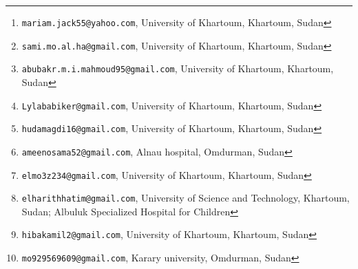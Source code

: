 \documentclass[12pt]{article}
\title{\color{titleColor}{\textbf{\Huge Resilience, Perceived Danger, and Work Attendance of Sudanese Healthcare Workers In War Zones: The April 2023 Armed Conflict}}}
\author{
    1-Maryam Mohamed\textsuperscript{*}\thanks{\texttt{mariam.jack55@yahoo.com}, University of Khartoum, Khartoum, Sudan} \\
    2-Sami Hassan\thanks{\texttt{sami.mo.al.ha@gmail.com}, University of Khartoum, Khartoum, Sudan} \\
    3-Abubakr Mahmoud\thanks{\texttt{abubakr.m.i.mahmoud95@gmail.com}, University of Khartoum, Khartoum, Sudan} \\
    4-Laila Osman\thanks{\texttt{Lylababiker@gmail.com}, University of Khartoum, Khartoum, Sudan} \\
    5-Huda Ahmed\thanks{\texttt{hudamagdi16@gmail.com}, University of Khartoum, Khartoum, Sudan} \\
    6-Alameen Osama Abdalgadir Abass\thanks{\texttt{ameenosama52@gmail.com}, Alnau hospital, Omdurman, Sudan} \\
    7-Elmoez abdoalazeem Omer mhadey\thanks{\texttt{elmo3z234@gmail.com}, University of Khartoum, Khartoum, Sudan} \\
    8-Elharith Hatim Elhag Abdelwahid\thanks{\texttt{elharithhatim@gmail.com}, University of Science and Technology, Khartoum, Sudan; Albuluk Specialized Hospital for Children} \\
    9-Hiba Hamad\thanks{\texttt{hibakamil2@gmail.com}, University of Khartoum, Khartoum, Sudan} \\
    10-Mohamed Osman Abdalla Osman\thanks{\texttt{mo929569609@gmail.com}, Karary university, Omdurman, Sudan} \\
    \small{\textsuperscript{*}Corresponding author}
}
\date{} %
\begin{document}
\maketitle


\newpage 

\begin{abstract}
\noindent \textbf{Background:} Traumatic war events can impair healthcare workers functioning and psychological wellbeing. We aim to assess Sudanese healthcare workers resilience, attendance, and perceived sense of danger in active conflict zones. \\
\textbf{Methods:} We conducted a cross-sectional study (January and March 2025) in four major public hospitals operating in combat zones, Omdurman city. Participants included doctors, nurses, lab technicians, and Pharmacists. We used a self-administered questionnaire assessing: sociodemographics, traumatic exposure, Connor-Davidson Resilience Scale-10, Solomon and Prager adapted Sense of Danger Inventory, and work attendance. Non-parametric tests, chi-square/Fisher’s exact tests, Spearman’s correlation, and multivariable linear regression were performed using SPSS v27, with significance set at $p < 0.05$. \\


\textbf{Results:} Among 325 participants (mean age 28.3 $\pm$ 4.9 year; female (57.2\%), (60\%) reported property damage, with personal (21\%) or family (49\%) injury, and workplace security escalations (41\%), while utilization of support services was limited. Attendance was higher among males, single workers, those with crisis training, and without personal or family injuries. Median resilience score was 24.00 (IQR = 12.00) with (68.6\%) having low resilience, associated with male gender, higher religiosity, crisis training, full attendance, and hospital assignment. Median sense of danger was high (Md = 14.0), particularly among pharmacists/lab technicians and Albuluk staff, it was associated with security escalations and lack of group activities. Resilience and sense of danger showed a weak but significant positive correlation (rho = 0.178, $p$ = 0.001). \\
\textbf{Conclusion:} Sudanese healthcare workers in conflict zones exhibited low resilience and high perceived danger, influenced by gender, crisis training, and workplace security. These findings underscore the need for urgent mental health and safety interventions to sustain this critical workforce.

\vspace{1em}
\noindent \textbf{Keywords:} Resilience, Sense of Danger, Work attendance, healthcare workers, armed conflict, war, Sudan
\end{abstract}
\end{document}

